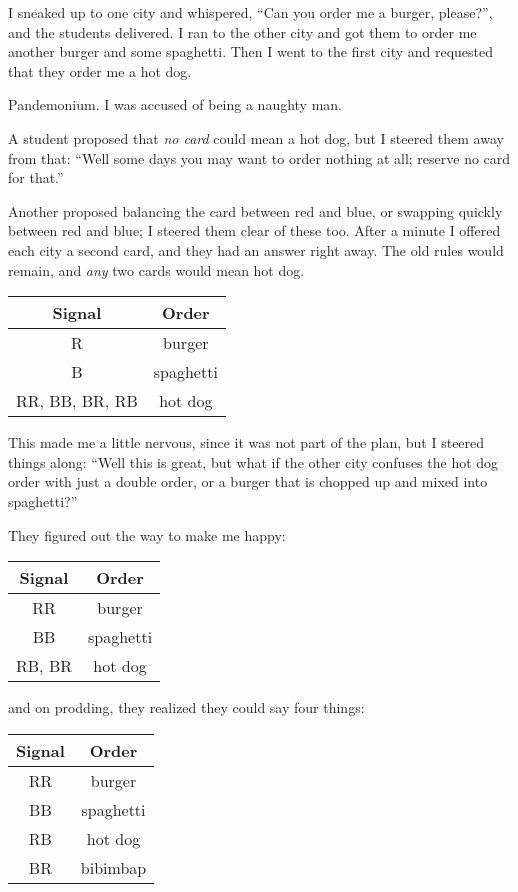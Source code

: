 \documentclass[sigplan]{acmart}
\begin{document}
I sneaked up to one city and whispered, ``Can you order me a burger, please?'', and the students delivered.
I ran to the other city and got them to order me another burger and some spaghetti.
Then I went to the first city and requested that they order me a hot dog.

Pandemonium.
I was accused of being a naughty man.

A student proposed that \emph{no card} could mean a hot dog, but I steered them away from that: ``Well some days you may want to order nothing at all; reserve no card for that.''

Another proposed balancing the card between red and blue, or swapping quickly between red and blue; I steered them clear of these too.
After a minute I offered each city a second card, and they had an answer right away.
The old rules would remain, and \emph{any} two cards would mean hot dog.

\begin{table}[h]\sffamily
  \begin{tabular}{cc}
  Signal & Order \\
  \midrule
  R & burger \\
  B & spaghetti \\
  RR, BB, BR, RB & hot dog
  \end{tabular}
\end{table}

This made me a little nervous, since it was not part of the plan, but I steered things along:
``Well this is great, but what if the other city confuses the hot dog order with just a double order, or a burger that is chopped up and mixed into spaghetti?''

They figured out the way to make me happy:

\begin{table}[h]\sffamily
  \begin{tabular}{cc}
  Signal & Order \\
  \midrule
  RR & burger \\
  BB & spaghetti \\
  RB, BR & hot dog
  \end{tabular}
\end{table}

\noindent and on prodding, they realized they could say four things:

\begin{table}[h]\sffamily
  \begin{tabular}{cc}
  Signal & Order \\
  \midrule
  RR & burger \\
  BB & spaghetti \\
  RB & hot dog \\
  BR & bibimbap
  \end{tabular}
\end{table}
\end{document}

